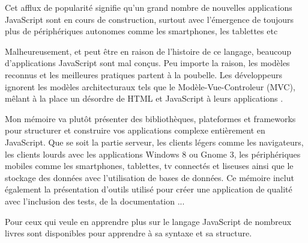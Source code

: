 Cet afflux de popularité signifie qu’un grand nombre de nouvelles applications JavaScript sont en cours de construction, surtout avec l’émergence de toujours plus de périphériques autonomes comme les smartphones, les tablettes etc

Malheureusement, et peut être en raison de l’histoire de ce langage, beaucoup d’applications JavaScript sont mal conçus. Peu importe la raison, les modèles reconnus et les meilleures pratiques partent à la poubelle. Les développeurs ignorent les modèles architecturaux tels que le Modèle-Vue-Controleur (MVC), mêlant à la place un désordre de HTML et JavaScript à leurs applications .

Mon mémoire va plutôt présenter des bibliothèques, plateformes et frameworks pour structurer et construire vos applications complexe entièrement en JavaScript. Que se soit la partie serveur, les clients légers comme les navigateurs, les clients lourds avec les applications Windows 8 ou Gnome 3, les périphériques mobiles comme les smartphones, tablettes, tv connectés et liseuses ainsi que le stockage des données avec l’utilisation de bases de données. Ce mémoire inclut également la présentation d'outils utilisé pour créer une application de qualité avec l’inclusion des tests, de la documentation ...

Pour ceux qui veule en apprendre plus sur le langage JavaScript de nombreux livres sont disponibles pour apprendre à sa syntaxe et sa structure.

